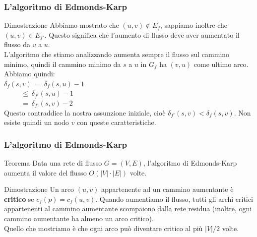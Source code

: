 \documentclass{beamer}
\begin{document}
\begin{frame}
\frametitle{L'algoritmo di Edmonds-Karp}
\begin{block}{Dimostrazione}
Abbiamo mostrato che $(u,v)\not\in E_f$, sappiamo inoltre che $(u,v)\in E_{f'}$. Questo significa che l'aumento di flusso deve aver aumentato il flusso da $v$ a $u$.\\
L'algoritmo che stiamo analizzando aumenta sempre il flusso sul cammino minimo, quindi il cammino minimo da $s$ a $u$ in $G_f$ ha $(v,u)$ come ultimo arco. Abbiamo quindi:\\
$\delta_f(s,v)\ =\ \delta_f(s,u)-1$\\
$\ \ \ \ \ \ \ \ \ \ \ \leq\ \delta_{f'}(s,u)-1$\\
$\ \ \ \ \ \ \ \ \ \ \ =\ \delta_{f'}(s,v)-2$\\
Questo contraddice la nostra assunzione iniziale, cioè $\delta_{f'}(s,v)<\delta_f(s,v)$. Non esiste quindi un nodo $v$ con queste caratteristiche.
\end{block}
\end{frame}

\begin{frame}
\frametitle{L'algoritmo di Edmonds-Karp}
\begin{block}{Teorema}
Data una rete di flusso $G=(V,E)$, l'algoritmo di Edmonds-Karp aumenta il valore del flusso $O(|V|\cdot|E|)$ volte.
\end{block}
\begin{block}{Dimostrazione}
Un arco $(u,v)$ appartenente ad un cammino aumentante è \textbf{critico} se $c_f(p)=c_f(u,v)$. Quando aumentiamo il flusso, tutti gli archi critici appartenenti al cammino aumentante scompaiono dalla rete residua (inoltre, ogni cammino aumentante ha almeno un arco critico).\\
Quello che mostriamo è che ogni arco può diventare critico al più $|V|/2$ volte.
\end{block}
\end{frame}
\end{document}
